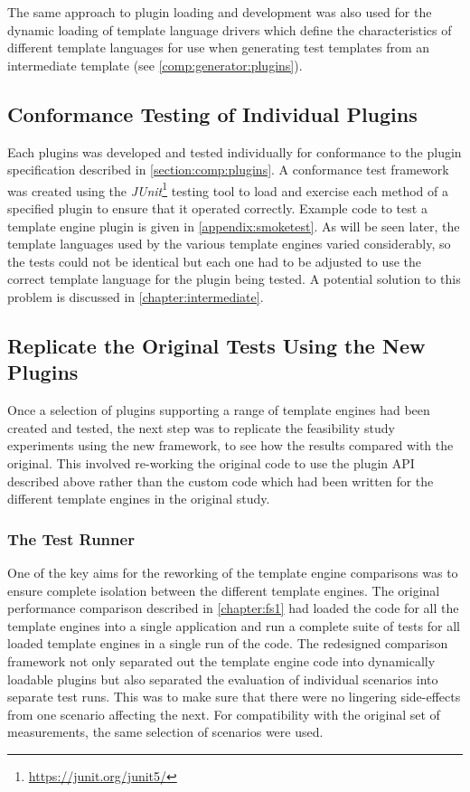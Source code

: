 The same approach to plugin loading and development was also used for the dynamic loading of template language drivers which define the characteristics of different template languages for use when generating test templates from an intermediate template (see \autoref{comp:generator:plugins}).

\subsection{Conformance Testing of Individual Plugins}
\label{section:comp:testing}

Each plugins was developed and tested individually for conformance to the plugin specification described in \autoref{section:comp:plugins}. A conformance test framework was created using the \emph{JUnit}\footnote{\url{https://junit.org/junit5/}} testing tool to load and exercise each method of a specified plugin to ensure that it operated correctly. Example code to test a template engine plugin is given in \autoref{appendix:smoketest}. As will be seen later, the template languages used by the various template engines varied considerably, so the tests could not be identical but each one had to be adjusted to use the correct template language for the plugin being tested. A potential solution to this problem is discussed in \autoref{chapter:intermediate}.

\subsection{Replicate the Original Tests Using the New Plugins}
\label{section:comp:test replication}

Once a selection of plugins supporting a range of template engines had been created and tested, the next step was to replicate the feasibility study experiments using the new framework, to see how the results compared with the original. This involved re-working the original code to use the plugin API described above rather than the custom code which had been written for the different template engines in the original study.

\subsubsection{The Test Runner}
\label{section:comp:test runner}

One of the key aims for the reworking of the template engine comparisons was to ensure complete isolation between the different template engines. The original performance comparison described in \autoref{chapter:fs1} had loaded the code for all the template engines into a single application and run a complete suite of tests for all loaded template engines in a single run of the code. The redesigned comparison framework not only separated out the template engine code into dynamically loadable plugins but also separated the evaluation of individual scenarios into separate test runs. This was to make sure that there were no lingering side-effects from one scenario affecting the next. For compatibility with the original set of measurements, the same selection of scenarios were used.

